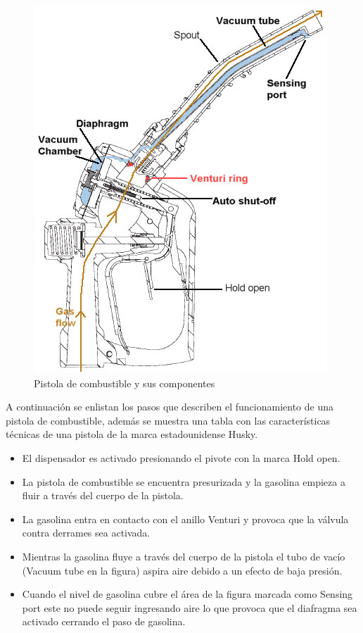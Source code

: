 \begin{figure}[H]
	\centering
	\includegraphics[scale=.6]{Capitulo2/images/nozzle}
	\caption{Pistola de combustible y sus componentes}
	\label{fig:nozzle}
\end{figure}

A continuación se enlistan los pasos que describen el funcionamiento de una pistola de combustible, además se muestra una tabla con las características técnicas de una pistola de la marca estadounidense Husky.

\begin{itemize}
	\item El dispensador es activado presionando el pivote con la marca Hold open.
	\item La pistola de combustible se encuentra presurizada y la gasolina empieza a fluir a través del cuerpo de la pistola.
	\item La gasolina entra en contacto con el anillo Venturi y provoca que la válvula contra derrames sea activada.
	\item Mientras la gasolina fluye a través del cuerpo de la pistola el tubo de vacío (Vacuum tube en la figura) aspira aire debido a un efecto de baja presión.
	\item Cuando el nivel de gasolina cubre el área de la figura marcada como Sensing port este no puede seguir ingresando aire lo que provoca que el diafragma sea activado cerrando el paso de gasolina.
\end{itemize}

